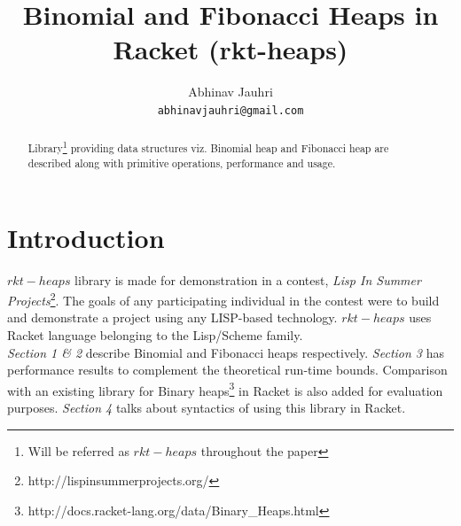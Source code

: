 \documentclass{llncs}
\title{Binomial and Fibonacci Heaps in Racket (rkt-heaps)}
\begin{document}
\author{
	Abhinav Jauhri\\
	\texttt{abhinavjauhri@gmail.com}\\
}


%




\maketitle

\begin{abstract}
	Library\footnote{Will be referred as $rkt-heaps$ throughout the paper} providing data structures viz. Binomial heap \cite{vuillemin1978data} and Fibonacci heap\cite{fredman1987fibonacci} are described along with primitive operations, performance and usage. 
\end{abstract}

\section{Introduction}
$rkt-heaps$ library is made for demonstration in a contest, \textit{Lisp In Summer Projects}\footnote{http://lispinsummerprojects.org/}. The goals of any participating individual in the contest were to build and demonstrate a project using any LISP-based technology. $rkt-heaps$ uses Racket language belonging to the Lisp/Scheme family. \\

\emph{Section 1 \& 2} describe Binomial and Fibonacci heaps respectively. \emph{Section 3} has performance results to complement the theoretical run-time bounds. Comparison with an existing library for Binary heaps\footnote{http://docs.racket-lang.org/data/Binary\_Heaps.html} in Racket is also added for evaluation purposes. \emph{Section 4} talks about syntactics of using this library in Racket.
\end{document}
